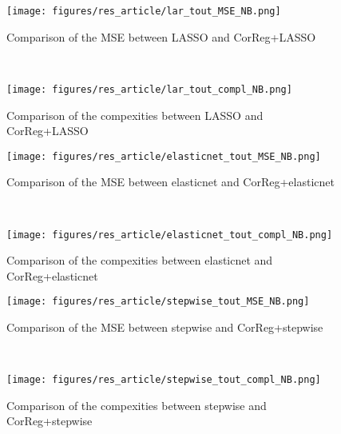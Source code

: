 \documentclass[12pt,a4paper]{report}
\begin{document}

 \begin{figure}[h!]
	\begin{minipage}[l]{.48\linewidth}
			\texttt{[image: figures/res\_article/lar\_tout\_MSE\_NB.png]} 
			\caption{Comparison of the MSE between LASSO and CorReg+LASSO}
	\end{minipage} \
   \begin{minipage}[r]{.48\linewidth}
			\texttt{[image: figures/res\_article/lar\_tout\_compl\_NB.png]} 
			\caption{Comparison of the compexities between LASSO and CorReg+LASSO} 
   \end{minipage}
\end{figure}

 \begin{figure}[h!]
	\begin{minipage}[l]{.48\linewidth}
			\texttt{[image: figures/res\_article/elasticnet\_tout\_MSE\_NB.png]} 
			\caption{Comparison of the MSE between elasticnet and CorReg+elasticnet}
	\end{minipage} \
   \begin{minipage}[r]{.48\linewidth}
			\texttt{[image: figures/res\_article/elasticnet\_tout\_compl\_NB.png]} 
			\caption{Comparison of the compexities between elasticnet and CorReg+elasticnet} 
   \end{minipage}
\end{figure}

 \begin{figure}[h!]
	\begin{minipage}[l]{.48\linewidth}
			\texttt{[image: figures/res\_article/stepwise\_tout\_MSE\_NB.png]} 
			\caption{Comparison of the MSE between stepwise and CorReg+stepwise}
	\end{minipage} \
   \begin{minipage}[r]{.48\linewidth}
			\texttt{[image: figures/res\_article/stepwise\_tout\_compl\_NB.png]} 
			\caption{Comparison of the compexities between stepwise and CorReg+stepwise} 
   \end{minipage}
\end{figure}
\end{document}
